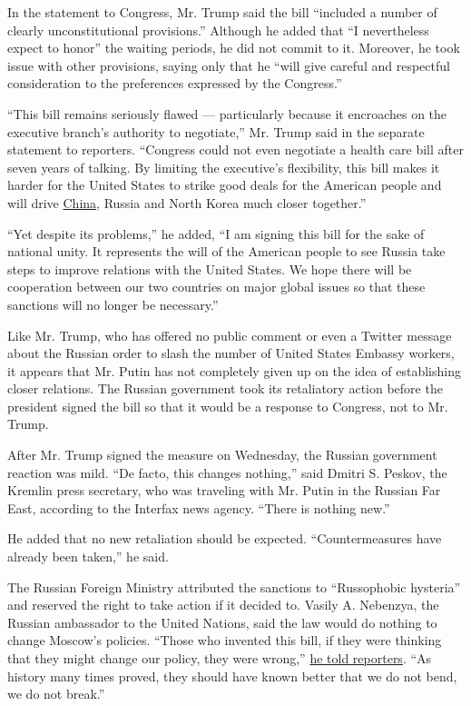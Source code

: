 In the statement to Congress, Mr. Trump said the bill ``included a
number of clearly unconstitutional provisions.'' Although he added that
``I nevertheless expect to honor'' the waiting periods, he did not
commit to it. Moreover, he took issue with other provisions, saying only
that he ``will give careful and respectful consideration to the
preferences expressed by the Congress.''

``This bill remains seriously flawed --- particularly because it
encroaches on the executive branch's authority to negotiate,'' Mr. Trump
said in the separate statement to reporters. ``Congress could not even
negotiate a health care bill after seven years of talking. By limiting
the executive's flexibility, this bill makes it harder for the United
States to strike good deals for the American people and will drive
\href{https://www.nytimes.com/topic/destination/china}{China}, Russia
and North Korea much closer together.''

``Yet despite its problems,'' he added, ``I am signing this bill for the
sake of national unity. It represents the will of the American people to
see Russia take steps to improve relations with the United States. We
hope there will be cooperation between our two countries on major global
issues so that these sanctions will no longer be necessary.''

Like Mr. Trump, who has offered no public comment or even a Twitter
message about the Russian order to slash the number of United States
Embassy workers, it appears that Mr. Putin has not completely given up
on the idea of establishing closer relations. The Russian government
took its retaliatory action before the president signed the bill so that
it would be a response to Congress, not to Mr. Trump.

After Mr. Trump signed the measure on Wednesday, the Russian government
reaction was mild. ``De facto, this changes nothing,'' said Dmitri S.
Peskov, the Kremlin press secretary, who was traveling with Mr. Putin in
the Russian Far East, according to the Interfax news agency. ``There is
nothing new.''

He added that no new retaliation should be expected. ``Countermeasures
have already been taken,'' he said.

The Russian Foreign Ministry attributed the sanctions to ``Russophobic
hysteria'' and reserved the right to take action if it decided to.
Vasily A. Nebenzya, the Russian ambassador to the United Nations, said
the law would do nothing to change Moscow's policies. ``Those who
invented this bill, if they were thinking that they might change our
policy, they were wrong,'' \href{http://tass.com/politics/958818}{he
told reporters}. ``As history many times proved, they should have known
better that we do not bend, we do not break.''

